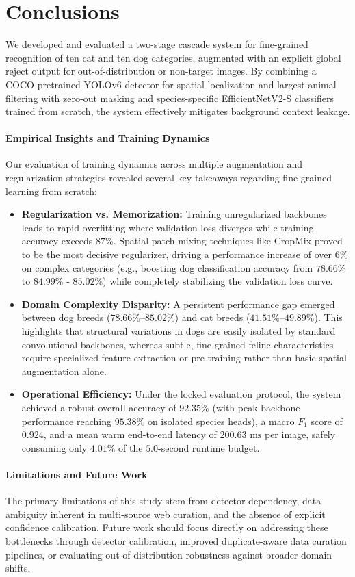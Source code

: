 \section{Conclusions}
\label{sec:05_conclusions}

We developed and evaluated a two-stage cascade system for fine-grained recognition of ten cat and ten dog categories, augmented with an explicit global reject output for out-of-distribution or non-target images. By combining a COCO-pretrained YOLOv6 detector for spatial localization and largest-animal filtering with zero-out masking and species-specific EfficientNetV2-S classifiers trained from scratch, the system effectively mitigates background context leakage.

\paragraph{Empirical Insights and Training Dynamics}
Our evaluation of training dynamics across multiple augmentation and regularization strategies revealed several key takeaways regarding fine-grained learning from scratch:
\begin{itemize}
    \item \textbf{Regularization vs. Memorization:} Training unregularized backbones leads to rapid overfitting where validation loss diverges while training accuracy exceeds $87\%$. Spatial patch-mixing techniques like CropMix proved to be the most decisive regularizer, driving a performance increase of over $6\%$ on complex categories (e.g., boosting dog classification accuracy from $78.66\%$ to $84.99\%$ - $85.02\%$) while completely stabilizing the validation loss curve.
    \item \textbf{Domain Complexity Disparity:} A persistent performance gap emerged between dog breeds ($78.66\%$–$85.02\%$) and cat breeds ($41.51\%$–$49.89\%$). This highlights that structural variations in dogs are easily isolated by standard convolutional backbones, whereas subtle, fine-grained feline characteristics require specialized feature extraction or pre-training rather than basic spatial augmentation alone.
    \item \textbf{Operational Efficiency:} Under the locked evaluation protocol, the system achieved a robust overall accuracy of $92.35\%$ (with peak backbone performance reaching $95.38\%$ on isolated species heads), a macro $F_1$ score of $0.924$, and a mean warm end-to-end latency of $200.63\text{ ms}$ per image, safely consuming only $4.01\%$ of the $5.0$-second runtime budget.
\end{itemize}

\paragraph{Limitations and Future Work}
The primary limitations of this study stem from detector dependency, data ambiguity inherent in multi-source web curation, and the absence of explicit confidence calibration. Future work should focus directly on addressing these bottlenecks through detector calibration, improved duplicate-aware data curation pipelines, or evaluating out-of-distribution robustness against broader domain shifts.